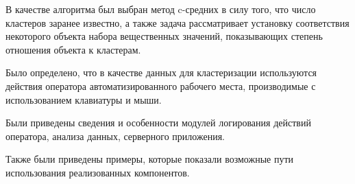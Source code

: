 В качестве алгоритма был выбран метод c-средних в силу того, что число кластеров заранее известно, а также задача рассматривает установку соответствия некоторого объекта набора вещественных значений, показывающих степень отношения объекта к кластерам.

Было определено, что в качестве данных для кластеризации используются действия оператора автоматизированного рабочего места, производимые с использованием клавиатуры и мыши.

Были приведены сведения и особенности модулей логирования действий оператора, анализа данных, серверного приложения.

Также были приведены примеры, которые показали возможные пути использования реализованных компонентов.
